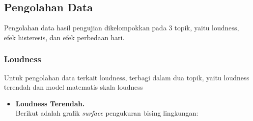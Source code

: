 \documentclass[12pt,]{article}
\begin{document}
	\subsection{Pengolahan Data}
	
	Pengolahan data hasil pengujian dikelompokkan pada 3 topik, yaitu loudness, efek histeresis, dan efek perbedaan hari.
	
	\subsubsection{Loudness}
	
	Untuk pengolahan data terkait loudness, terbagi dalam dua topik, yaitu loudness terendah dan model matematis skala loudness
	
	\begin{itemize}
		\item \textbf{Loudness Terendah.}\\
		
		Berikut adalah grafik \textit{surface} pengukuran bising lingkungan:
		

\end{itemize}
\end{document}
